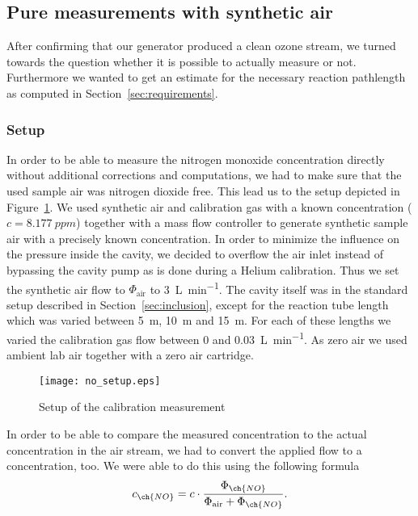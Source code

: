 \subsection{Pure  measurements with synthetic air}
\label{sec:no}

After confirming that our generator produced a clean ozone stream, we
turned towards the question whether it is possible to actually measure
 or not. Furthermore we wanted to get an estimate for the
necessary reaction pathlength as computed in
Section~\ref{sec:requirements}.

\subsubsection{Setup}
\label{sec:no-setup}

In order to be able to measure the nitrogen monoxide concentration
directly without additional corrections and computations, we had to
make sure that the used sample air was nitrogen dioxide free. This
lead us to the setup depicted in Figure~\ref{fig:no-setup}. We used
synthetic air and  calibration gas with a known 
concentration ($c = \SI{8.177}{ppm}$) together with a mass flow
controller to generate synthetic sample air with a precisely known
 concentration. In order to minimize the influence on the
pressure inside the cavity, we decided to overflow the air inlet
instead of bypassing the cavity pump as is done during a Helium
calibration. Thus we set the synthetic air flow to $\Phi_{\text{air}}$
to \SI{3}{\liter\per\minute}. The cavity itself was in the standard
setup described in Section~\ref{sec:inclusion}, except for the
reaction tube length which was varied between \SI{5}{\meter},
\SI{10}{\meter} and \SI{15}{\meter}. For each of these lengths we
varied the  calibration gas flow between \num{0} and
\SI{0.03}{\liter\per\minute}. As zero air we used ambient lab air
together with a zero air cartridge.

\begin{figure}[htbp]
  \centering
  \texttt{[image: no\_setup.eps]}
  \caption{Setup of the calibration measurement}
  \label{fig:no-setup}
\end{figure}

In order to be able to compare the measured  concentration to the
actual concentration in the air stream, we had to convert the applied
 flow to a concentration, too. We were able to do this using the
following formula
\begin{align}
  c_{\ch{NO}} = c \cdot \frac{\Phi_{\ch{NO}}}{\Phi_{\text{air}} +
  \Phi_{\ch{NO}}}. \label{eq:c-flow}
\end{align}

